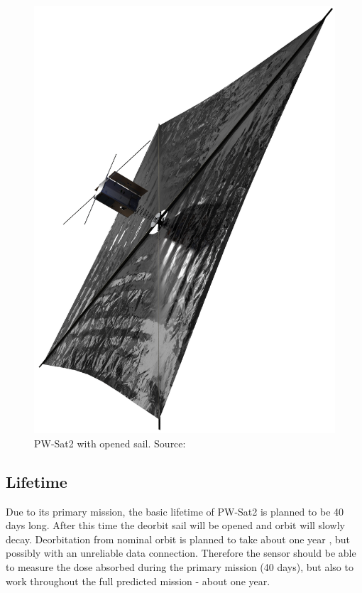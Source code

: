         \begin{figure}[H]
            \centering
            \includegraphics[width=0.38\paperwidth]{img/04/PW-Sat2_render_02.png}
            \caption{PW-Sat2 with opened sail. Source: \cite{PW_sat2_photo}}
            \label{PW-Sat_render_sail}
        \end{figure}

    \subsection{Lifetime}
        Due to its primary mission, the basic lifetime of PW-Sat2 is planned to be 40 days long. After this time the deorbit sail will be opened and orbit will slowly decay. Deorbitation from nominal orbit is planned to take about one year \cite{PWSAT_MA_CDR}, but possibly with an unreliable data connection. Therefore the sensor should be able to measure the dose absorbed during the primary mission (40 days), but also to work throughout the full predicted mission - about one year.

